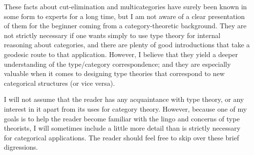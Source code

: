 These facts about cut-elimination and multicategories have surely been known in some form to experts for a long time, but I am not aware of a clear presentation of them for the beginner coming from a category-theoretic background.
They are not strictly necessary if one wants simply to use type theory for internal reasoning about categories, and there are plenty of good introductions that take a geodesic route to that application.
However, I believe that they yield a deeper understanding of the type/category correspondence; and they are especially valuable when it comes to designing type theories that correspond to new categorical structures (or vice versa).

I will not assume that the reader has any acquaintance with type theory, or any interest in it apart from its uses for category theory.
However, because one of my goals is to help the reader become familiar with the lingo and concerns of type theorists, I will sometimes include a little more detail than is strictly necessary for categorical applications.
The reader should feel free to skip over these brief digressions.

